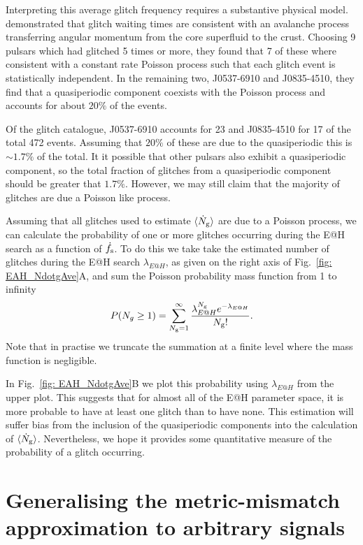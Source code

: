 \documentclass[../full_thesis/full_thesis.tex]{subfiles}
\begin{document}
Interpreting this average glitch frequency requires a substantive physical
model. \citet{Melatos2008} demonstrated that glitch waiting times are consistent
with an avalanche process transferring angular momentum from the core superfluid
to the crust. Choosing 9 pulsars which had glitched 5 times or more, they found
that 7 of these where consistent with a constant rate Poisson process such that
each glitch event is statistically independent. In the remaining two, J0537-6910
and J0835-4510, they find that a quasiperiodic component coexists with the Poisson
process and accounts for about $20\%$ of the events.

Of the glitch catalogue, J0537-6910 accounts for 23 and J0835-4510 for 17 of
the total 472 events. Assuming that $20\%$ of these are due to the quasiperiodic
this is $\sim 1.7\%$ of the total. It it possible that other pulsars also exhibit
a quasiperiodic component, so the total fraction of glitches from a quasiperiodic
component should be greater that $1.7\%$. However, we may still claim that the
majority of glitches are due a Poisson like process.

Assuming that all glitches used to estimate $\langle \dot{N}_{\textrm{g}}\rangle$ are due to a Poisson
process, we can calculate the probability of one or more glitches occurring during
the E@H search as a function of $\dot{f}_{\textrm{s}}$. To do this we take take the
estimated number of glitches during the E@H search
$\lambda_{E@H}$, as given on the right axis of Fig.~\ref{fig: EAH_NdotgAve}A,
and sum the Poisson probability mass function from 1 to infinity
\begin{align}
P(N_{g} \ge 1) = \sum_{N_{\textrm{g}}=1}^{\infty}\frac{\lambda_{E@H}^{N_{\textrm{g}}}e^{-\lambda_{E@H}}}{N_{\textrm{g}}!}.
\end{align}
Note that in practise we truncate the summation at a finite level where the
mass function is negligible.

In Fig.~\ref{fig: EAH_NdotgAve}B we plot this probability
using $\lambda_{E@H}$ from the upper plot. This suggests that for almost all of
the E@H parameter space, it is more probable to have at least one glitch than
to have none. This estimation will suffer bias from the inclusion of the
quasiperiodic components into the calculation of $\langle \dot{N}_{\textrm{g}}\rangle$. Nevertheless, we
hope it provides some quantitative measure of the probability of a glitch occurring.

\section{Generalising the metric-mismatch approximation to arbitrary signals}
\label{sec: generalising the metric-mismatch}
\end{document}
